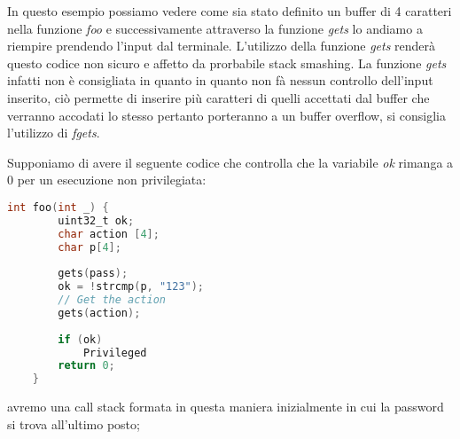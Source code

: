 In questo esempio possiamo vedere come sia stato definito un buffer di 4 caratteri nella funzione \textit{foo} e successivamente attraverso la funzione \textit{gets} lo andiamo a riempire prendendo l'input dal terminale.
L'utilizzo della funzione \textit{gets} renderà questo codice non sicuro e affetto da prorbabile stack smashing. La funzione \textit{gets} infatti non è consigliata in quanto in quanto non fà nessun controllo dell'input inserito, ciò permette di inserire più caratteri di quelli accettati dal buffer che verranno accodati lo stesso pertanto porteranno a un buffer overflow, si consiglia l'utilizzo di \textit{fgets}.

Supponiamo di avere il seguente codice che controlla che la variabile \textit{ok} rimanga a 0 per un esecuzione non privilegiata:

\begin{lstlisting}[language=C]
    int foo(int _) {
        uint32_t ok;
        char action [4];
        char p[4];
    
        gets(pass);
        ok = !strcmp(p, "123");
        // Get the action
        gets(action);
    
        if (ok)
            Privileged
        return 0;
    }
\end{lstlisting}

avremo una call stack formata in questa maniera inizialmente in cui la password si trova all'ultimo posto;

